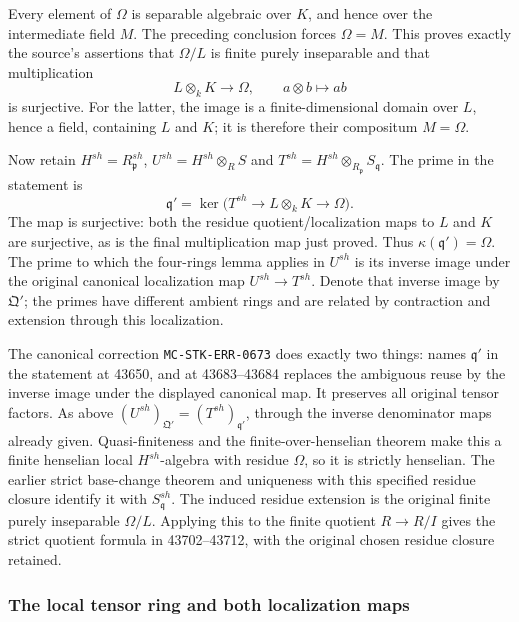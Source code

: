 Every element of \(\Omega\) is separable algebraic over \(K\), and hence over the intermediate field \(M\). The preceding conclusion forces \(\Omega=M\). This proves exactly the source's assertions that \(\Omega/L\) is finite purely inseparable and that multiplication \[
 L\otimes_k K\longrightarrow\Omega,\qquad a\otimes b\longmapsto ab
\] is surjective. For the latter, the image is a finite-dimensional domain over \(L\), hence a field, containing \(L\) and \(K\); it is therefore their compositum \(M=\Omega\).

Now retain \(H^{sh}=R_{\mathfrak p}^{sh}\), \(U^{sh}=H^{sh}\otimes_R S\) and \(T^{sh}=H^{sh}\otimes_{R_{\mathfrak p}}S_{\mathfrak q}\). The prime in the statement is \[
 \mathfrak q'=\ker\bigl(T^{sh}\longrightarrow L\otimes_k K
                                     \longrightarrow\Omega\bigr).
\] The map is surjective: both the residue quotient/localization maps to \(L\) and \(K\) are surjective, as is the final multiplication map just proved. Thus \(\kappa(\mathfrak q')=\Omega\). The prime to which the four-rings lemma applies in \(U^{sh}\) is its inverse image under the original canonical localization map \(U^{sh}\to T^{sh}\). Denote that inverse image by \(\mathfrak Q'\); the primes have different ambient rings and are related by contraction and extension through this localization.

The canonical correction \texttt{MC-STK-ERR-0673} does exactly two things: names \(\mathfrak q'\) in the statement at 43650, and at 43683--43684 replaces the ambiguous reuse by the inverse image under the displayed canonical map. It preserves all original tensor factors. As above \((U^{sh})_{\mathfrak Q'}=(T^{sh})_{\mathfrak q'}\), through the inverse denominator maps already given. Quasi-finiteness and the finite-over-henselian theorem make this a finite henselian local \(H^{sh}\)-algebra with residue \(\Omega\), so it is strictly henselian. The earlier strict base-change theorem and uniqueness with this specified residue closure identify it with \(S_{\mathfrak q}^{sh}\). The induced residue extension is the original finite purely inseparable \(\Omega/L\). Applying this to the finite quotient \(R\to R/I\) gives the strict quotient formula in 43702--43712, with the original chosen residue closure retained.

\subsubsection{The local tensor ring and both localization maps}\label{the-local-tensor-ring-and-both-localization-maps}


